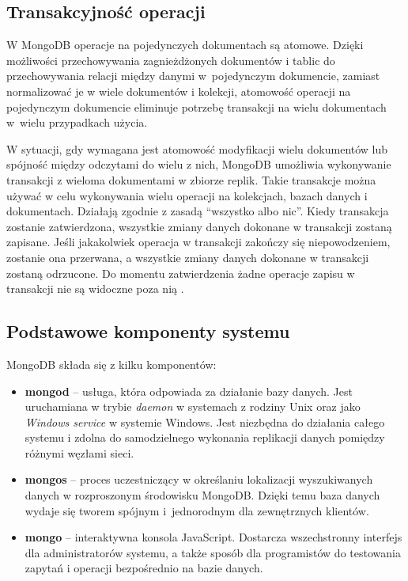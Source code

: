 \subsection{Transakcyjność operacji}

W MongoDB operacje na pojedynczych dokumentach są atomowe.
Dzięki możliwości przechowywania zagnieżdżonych dokumentów i tablic do przechowywania relacji między danymi w~pojedynczym dokumencie, zamiast normalizować je w wiele dokumentów i kolekcji, atomowość operacji na pojedynczym dokumencie eliminuje potrzebę transakcji na wielu dokumentach w~wielu przypadkach użycia.

W sytuacji, gdy wymagana jest atomowość modyfikacji wielu dokumentów lub spójność między odczytami do wielu z nich, MongoDB umożliwia wykonywanie transakcji z wieloma dokumentami w zbiorze replik.
Takie transakcje można używać w celu wykonywania wielu operacji na kolekcjach, bazach danych i dokumentach.
Działają zgodnie z zasadą \enquote{wszystko albo nic}.
Kiedy transakcja zostanie zatwierdzona, wszystkie zmiany danych dokonane w transakcji zostaną zapisane.
Jeśli jakakolwiek operacja w transakcji zakończy się niepowodzeniem, zostanie ona przerwana, a wszystkie zmiany danych dokonane w transakcji zostaną odrzucone.
Do momentu zatwierdzenia żadne operacje zapisu w transakcji nie są widoczne poza nią \cite{MongoDBTransactions}.

\subsection{Podstawowe komponenty systemu}

MongoDB składa się z kilku komponentów:
\begin{itemize}
    \item \textbf{mongod} -- usługa, która odpowiada za działanie bazy danych.
    Jest uruchamiana w trybie \textit{daemon} w systemach z rodziny Unix oraz jako \textit{Windows service} w  systemie Windows.
    Jest niezbędna do działania całego systemu i zdolna do samodzielnego wykonania replikacji danych pomiędzy różnymi węzłami sieci.
    \item \textbf{mongos} -- proces uczestniczący w określaniu lokalizacji wyszukiwanych danych w rozproszonym środowisku MongoDB.
    Dzięki temu baza danych wydaje się tworem spójnym i~jednorodnym dla zewnętrznych klientów.
    \item \textbf{mongo} -- interaktywna konsola JavaScript.
    Dostarcza wszechstronny interfejs dla administratorów systemu, a także sposób dla programistów do testowania zapytań i operacji bezpośrednio na bazie danych.
\end{itemize}


